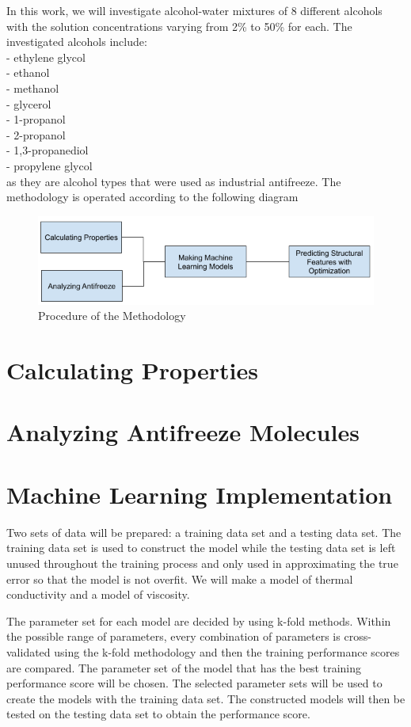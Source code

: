In this work, we will investigate alcohol-water mixtures of 8 different 
alcohols with the solution concentrations varying from 2\% to 50\% for each.
The investigated alcohols include:\\
- ethylene glycol\\
- ethanol\\
- methanol\\
- glycerol\\ 
- 1-propanol\\
- 2-propanol\\ 
- 1,3-propanediol\\
- propylene glycol\\
as they are alcohol types that were used as industrial antifreeze.
The methodology is operated according to the following diagram
\begin{figure}
    \begin{center}
        \includegraphics[width=1\textwidth]{method.png}
    \end{center}
    \caption{Procedure of the Methodology}
\end{figure}
\section{Calculating Properties}

\section{Analyzing Antifreeze Molecules}

\section{Machine Learning Implementation}
Two sets of data will be prepared: a training data set and a testing data set. 
The training data set is used to construct the model while the testing data 
set is left unused throughout the training process and only used in 
approximating the true error so that the model is not overfit. We will make 
a model of thermal conductivity and a model of viscosity.

The parameter set for each model are decided by using k-fold methods. 
Within the possible range of parameters, every combination of parameters 
is cross-validated using the k-fold methodology and then the training 
performance scores are compared. The parameter set of the model that has 
the best training performance score will be chosen.
The selected parameter sets will be used to create the models with the 
training data set. The constructed models will then be tested on the 
testing data set to obtain the performance score. 

